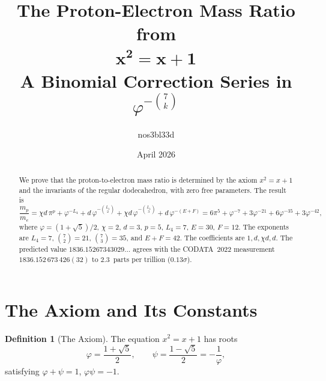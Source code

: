 \documentclass[11pt,a4paper]{article}
\theoremstyle{plain}
\theoremstyle{definition}
\newtheorem{definition}[theorem]{Definition}
\newcommand{\vp}{\varphi}
\begin{document}
\title{%
  \textbf{The Proton-Electron Mass Ratio from}\\[4pt]
  $\boldsymbol{x^2 = x + 1}$\\[4pt]
  \large A Binomial Correction Series in $\vp^{-\binom{7}{k}}$%
}
\author{nos3bl33d}
\date{April 2026}

\maketitle

\begin{abstract}
We prove that the proton-to-electron mass ratio is determined by the
axiom $x^2 = x+1$ and the invariants of the regular dodecahedron, with
zero free parameters.  The result is
\[
  \frac{m_p}{m_e}
  = \chi d\,\pi^p
  + \vp^{-L_4}
  + d\,\vp^{-\binom{L_4}{2}}
  + \chi d\,\vp^{-\binom{L_4}{3}}
  + d\,\vp^{-(E+F)}
  = 6\pi^5 + \vp^{-7} + 3\vp^{-21} + 6\vp^{-35} + 3\vp^{-42},
\]
where $\vp = (1+\sqrt{5})/2$, $\chi = 2$, $d = 3$, $p = 5$,
$L_4 = 7$, $E = 30$, $F = 12$.  The exponents are $L_4 = 7$,
$\binom{7}{2} = 21$, $\binom{7}{3} = 35$, and $E + F = 42$.
The coefficients are $1, d, \chi d, d$.  The predicted value
$1836.15267343029\ldots$ agrees with the CODATA~2022 measurement
$1836.152\,673\,426(32)$ to $2.3$~parts per trillion ($0.13\sigma$).
\end{abstract}

\section{The Axiom and Its Constants}\label{sec:axiom}

\begin{definition}[The Axiom]\label{def:axiom}
The equation $x^2 = x + 1$ has roots
\[
  \vp = \frac{1+\sqrt{5}}{2}, \qquad
  \psi = \frac{1-\sqrt{5}}{2} = -\frac{1}{\vp},
\]
satisfying $\vp + \psi = 1$, $\vp\psi = -1$.
\end{definition}
\end{document}
